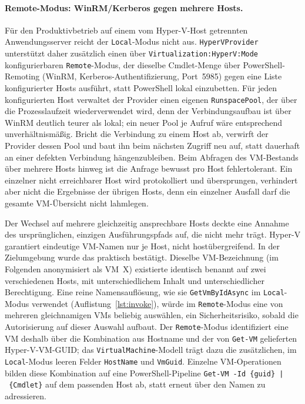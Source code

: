 \documentclass[12pt,a4paper]{article}
\begin{document}
\paragraph{Remote-Modus: WinRM/Kerberos gegen mehrere Hosts.} Für den Produktivbetrieb auf einem vom Hyper-V-Host getrennten Anwendungsserver reicht der \texttt{Local}-Modus nicht aus. \texttt{HyperVProvider} unterstützt daher zusätzlich einen über \texttt{Virtualization:HyperV:Mode} konfigurierbaren \texttt{Remote}-Modus, der dieselbe Cmdlet-Menge über PowerShell-Remoting (WinRM, Kerberos-Authentifizierung, Port~5985) gegen eine Liste konfigurierter Hosts ausführt, statt PowerShell lokal einzubetten. Für jeden konfigurierten Host verwaltet der Provider einen eigenen \texttt{RunspacePool}, der über die Prozesslaufzeit wiederverwendet wird, denn der Verbindungsaufbau ist über WinRM deutlich teurer als lokal; ein neuer Pool je Aufruf wäre entsprechend unverhältnismäßig. Bricht die Verbindung zu einem Host ab, verwirft der Provider dessen Pool und baut ihn beim nächsten Zugriff neu auf, statt dauerhaft an einer defekten Verbindung hängenzubleiben. Beim Abfragen des VM-Bestands über mehrere Hosts hinweg ist die Anfrage bewusst pro Host fehlertolerant. Ein einzelner nicht erreichbarer Host wird protokolliert und übersprungen, verhindert aber nicht die Ergebnisse der übrigen Hosts, denn ein einzelner Ausfall darf die gesamte VM-Übersicht nicht lahmlegen.

Der Wechsel auf mehrere gleichzeitig ansprechbare Hosts deckte eine Annahme des ursprünglichen, einzigen Ausführungspfads auf, die nicht mehr trägt. Hyper-V garantiert eindeutige VM-Namen nur je Host, nicht hostübergreifend. In der Zielumgebung wurde das praktisch bestätigt. Dieselbe VM-Bezeichnung (im Folgenden anonymisiert als \glqq VM~X\grqq) existierte identisch benannt auf zwei verschiedenen Hosts, mit unterschiedlichem Inhalt und unterschiedlicher Berechtigung. Eine reine Namensauflösung, wie sie \texttt{GetVmByIdAsync} im \texttt{Local}-Modus verwendet (Auflistung~\ref{lst:invoke}), würde im \texttt{Remote}-Modus eine von mehreren gleichnamigen VMs beliebig auswählen, ein Sicherheitsrisiko, sobald die Autorisierung auf dieser Auswahl aufbaut. Der \texttt{Remote}-Modus identifiziert eine VM deshalb über die Kombination aus Hostname und der von \texttt{Get-VM} gelieferten Hyper-V-VM-GUID; das \texttt{VirtualMachine}-Modell trägt dazu die zusätzlichen, im \texttt{Local}-Modus leeren Felder \texttt{HostName} und \texttt{VmGuid}. Einzelne VM-Operationen bilden diese Kombination auf eine PowerShell-Pipeline \texttt{Get-VM~-Id~\{guid\}~|~\{Cmdlet\}} auf dem passenden Host ab, statt erneut über den Namen zu adressieren.
\end{document}
